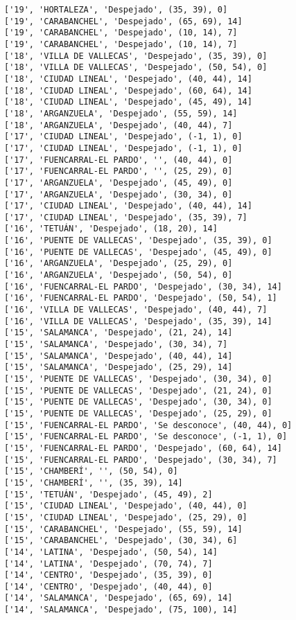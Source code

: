 \documentclass[11pt]{article}
\begin{document}
\begin{Verbatim}[commandchars=\\\{\}]
['19', 'HORTALEZA', 'Despejado', (35, 39), 0]
['19', 'CARABANCHEL', 'Despejado', (65, 69), 14]
['19', 'CARABANCHEL', 'Despejado', (10, 14), 7]
['19', 'CARABANCHEL', 'Despejado', (10, 14), 7]
['18', 'VILLA DE VALLECAS', 'Despejado', (35, 39), 0]
['18', 'VILLA DE VALLECAS', 'Despejado', (50, 54), 0]
['18', 'CIUDAD LINEAL', 'Despejado', (40, 44), 14]
['18', 'CIUDAD LINEAL', 'Despejado', (60, 64), 14]
['18', 'CIUDAD LINEAL', 'Despejado', (45, 49), 14]
['18', 'ARGANZUELA', 'Despejado', (55, 59), 14]
['18', 'ARGANZUELA', 'Despejado', (40, 44), 7]
['17', 'CIUDAD LINEAL', 'Despejado', (-1, 1), 0]
['17', 'CIUDAD LINEAL', 'Despejado', (-1, 1), 0]
['17', 'FUENCARRAL-EL PARDO', '', (40, 44), 0]
['17', 'FUENCARRAL-EL PARDO', '', (25, 29), 0]
['17', 'ARGANZUELA', 'Despejado', (45, 49), 0]
['17', 'ARGANZUELA', 'Despejado', (30, 34), 0]
['17', 'CIUDAD LINEAL', 'Despejado', (40, 44), 14]
['17', 'CIUDAD LINEAL', 'Despejado', (35, 39), 7]
['16', 'TETUÁN', 'Despejado', (18, 20), 14]
['16', 'PUENTE DE VALLECAS', 'Despejado', (35, 39), 0]
['16', 'PUENTE DE VALLECAS', 'Despejado', (45, 49), 0]
['16', 'ARGANZUELA', 'Despejado', (25, 29), 0]
['16', 'ARGANZUELA', 'Despejado', (50, 54), 0]
['16', 'FUENCARRAL-EL PARDO', 'Despejado', (30, 34), 14]
['16', 'FUENCARRAL-EL PARDO', 'Despejado', (50, 54), 1]
['16', 'VILLA DE VALLECAS', 'Despejado', (40, 44), 7]
['16', 'VILLA DE VALLECAS', 'Despejado', (35, 39), 14]
['15', 'SALAMANCA', 'Despejado', (21, 24), 14]
['15', 'SALAMANCA', 'Despejado', (30, 34), 7]
['15', 'SALAMANCA', 'Despejado', (40, 44), 14]
['15', 'SALAMANCA', 'Despejado', (25, 29), 14]
['15', 'PUENTE DE VALLECAS', 'Despejado', (30, 34), 0]
['15', 'PUENTE DE VALLECAS', 'Despejado', (21, 24), 0]
['15', 'PUENTE DE VALLECAS', 'Despejado', (30, 34), 0]
['15', 'PUENTE DE VALLECAS', 'Despejado', (25, 29), 0]
['15', 'FUENCARRAL-EL PARDO', 'Se desconoce', (40, 44), 0]
['15', 'FUENCARRAL-EL PARDO', 'Se desconoce', (-1, 1), 0]
['15', 'FUENCARRAL-EL PARDO', 'Despejado', (60, 64), 14]
['15', 'FUENCARRAL-EL PARDO', 'Despejado', (30, 34), 7]
['15', 'CHAMBERÍ', '', (50, 54), 0]
['15', 'CHAMBERÍ', '', (35, 39), 14]
['15', 'TETUÁN', 'Despejado', (45, 49), 2]
['15', 'CIUDAD LINEAL', 'Despejado', (40, 44), 0]
['15', 'CIUDAD LINEAL', 'Despejado', (25, 29), 0]
['15', 'CARABANCHEL', 'Despejado', (55, 59), 14]
['15', 'CARABANCHEL', 'Despejado', (30, 34), 6]
['14', 'LATINA', 'Despejado', (50, 54), 14]
['14', 'LATINA', 'Despejado', (70, 74), 7]
['14', 'CENTRO', 'Despejado', (35, 39), 0]
['14', 'CENTRO', 'Despejado', (40, 44), 0]
['14', 'SALAMANCA', 'Despejado', (65, 69), 14]
['14', 'SALAMANCA', 'Despejado', (75, 100), 14]

\end{Verbatim}
\end{document}
